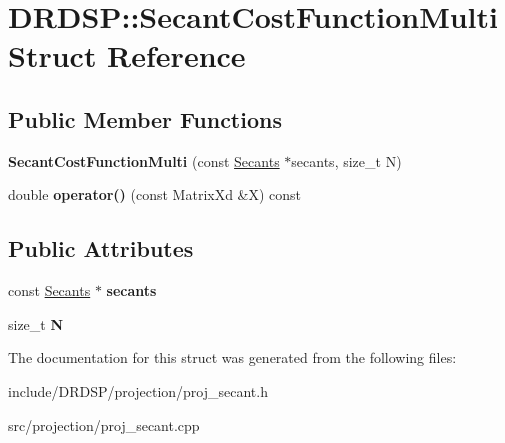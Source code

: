 \hypertarget{struct_d_r_d_s_p_1_1_secant_cost_function_multi}{\section{D\-R\-D\-S\-P\-:\-:Secant\-Cost\-Function\-Multi Struct Reference}
\label{struct_d_r_d_s_p_1_1_secant_cost_function_multi}
}
\subsection*{Public Member Functions}
\begin{DoxyCompactItemize}
\item 
\hypertarget{struct_d_r_d_s_p_1_1_secant_cost_function_multi_a4408a82da556da38e458fc2565c49891}{{\bfseries Secant\-Cost\-Function\-Multi} (const \hyperlink{struct_d_r_d_s_p_1_1_secants}{Secants} $\ast$secants, size\-\_\-t N)}\label{struct_d_r_d_s_p_1_1_secant_cost_function_multi_a4408a82da556da38e458fc2565c49891}

\item 
\hypertarget{struct_d_r_d_s_p_1_1_secant_cost_function_multi_a40271ed4db634786ff8732acb99e7ddb}{double {\bfseries operator()} (const Matrix\-Xd \&X) const }\label{struct_d_r_d_s_p_1_1_secant_cost_function_multi_a40271ed4db634786ff8732acb99e7ddb}

\end{DoxyCompactItemize}
\subsection*{Public Attributes}
\begin{DoxyCompactItemize}
\item 
\hypertarget{struct_d_r_d_s_p_1_1_secant_cost_function_multi_a5433e39d7091e942a4d9e09bbc74871f}{const \hyperlink{struct_d_r_d_s_p_1_1_secants}{Secants} $\ast$ {\bfseries secants}}\label{struct_d_r_d_s_p_1_1_secant_cost_function_multi_a5433e39d7091e942a4d9e09bbc74871f}

\item 
\hypertarget{struct_d_r_d_s_p_1_1_secant_cost_function_multi_a7c2b1b7e3474de697285d9265ed60c39}{size\-\_\-t {\bfseries N}}\label{struct_d_r_d_s_p_1_1_secant_cost_function_multi_a7c2b1b7e3474de697285d9265ed60c39}

\end{DoxyCompactItemize}


The documentation for this struct was generated from the following files\-:\begin{DoxyCompactItemize}
\item 
include/\-D\-R\-D\-S\-P/projection/proj\-\_\-secant.\-h\item 
src/projection/proj\-\_\-secant.\-cpp\end{DoxyCompactItemize}
